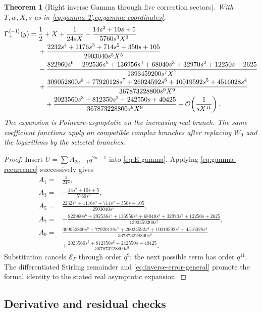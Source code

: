\documentclass[11pt,a4paper]{article}
\numberwithin{equation}{section}
\newtheorem{theorem}{Theorem}[section]
\theoremstyle{definition}
\theoremstyle{remark}
\newcommand{\Ord}{\mathcal O}
\newcommand{\cinv}{\langle-1\rangle}
\newcommand{\GamInv}{\Gamma_{+}^{\cinv}}
\begin{document}
\begin{theorem}[Right inverse Gamma through five correction sectors]
\label{thm:gamma-main}
With \(T,w,X,s\) as in \cref{eq:gamma-T,eq:gamma-coordinates},
\begin{align}
 \GamInv(y)={}&\frac12+X
 +\frac{1}{24sX}
 -\frac{14s^2+10s+5}{5760s^3X^3}
 \notag\\
 &+\frac{2232s^4+1176s^3+714s^2+350s+105}
 {2903040s^5X^5}
 \notag\\
 &-\frac{822960s^6+292536s^5+136956s^4+68040s^3
 +32970s^2+12250s+2625}
 {1393459200s^7X^7}
 \notag\\
 &+\frac{309052800s^8+77920128s^7+26024592s^6+10019592s^5
 +4516028s^4}{367873228800s^9X^9}
 \notag\\
 &\quad+\frac{2023560s^3+812350s^2+242550s+40425}
 {367873228800s^9X^9}
 +\Ord\!\left(\frac{1}{sX^{11}}\right).
 \label{eq:gamma-main-expansion}
\end{align}
The expansion is Poincare-asymptotic on the increasing real branch.  The
same coefficient functions apply on compatible complex branches after
replacing \(W_0\) and the logarithms by the selected branches.
\end{theorem}

\begin{proof}
Insert \(U=\sum A_{2n-1}q^{2n-1}\) into
\cref{eq:E-gamma}.  Applying \cref{eq:gamma-recurrence} successively gives
\begin{align*}
 A_1={}&\frac1{24s},\\
 A_3={}&-\frac{14s^2+10s+5}{5760s^3},\\
 A_5={}&\frac{2232s^4+1176s^3+714s^2+350s+105}{2903040s^5},\\
 A_7={}&-\frac{822960s^6+292536s^5+136956s^4+68040s^3
 +32970s^2+12250s+2625}{1393459200s^7},\\
 A_9={}&\frac{309052800s^8+77920128s^7+26024592s^6+10019592s^5
 +4516028s^4}{367873228800s^9}\\
 &+\frac{2023560s^3+812350s^2+242550s+40425}{367873228800s^9}.
\end{align*}
Substitution cancels \(\mathscr E_\Gamma\) through order \(q^9\); the next
possible term has order \(q^{11}\).  The differentiated Stirling remainder
and \cref{eq:inverse-error-general} promote the formal identity to the
stated real asymptotic expansion.
\end{proof}

\subsection{Derivative and residual checks}
\end{document}

